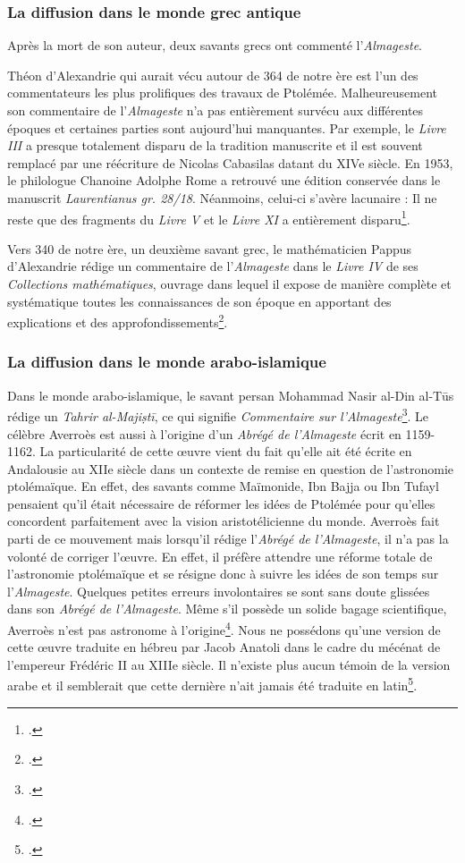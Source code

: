 \subsubsection{La diffusion dans le monde grec antique}
Après la mort de son auteur, deux savants grecs ont commenté l'\textit{Almageste}. 

Théon d'Alexandrie qui aurait vécu autour de 364 de notre ère est l'un des commentateurs les plus prolifiques des travaux de Ptolémée. Malheureusement son commentaire de l'\textit{Almageste} n'a pas entièrement survécu aux différentes époques et certaines parties sont aujourd'hui manquantes. Par exemple, le \textit{Livre III} a presque totalement disparu de la tradition manuscrite et il est souvent remplacé par une réécriture de Nicolas Cabasilas datant du XIVe siècle. En 1953, le philologue Chanoine Adolphe Rome a retrouvé une édition conservée dans le manuscrit \textit{Laurentianus gr. 28/18}. Néanmoins, celui-ci s'avère lacunaire : Il ne reste que des fragments du \textit{Livre V} et le \textit{Livre XI} a entièrement disparu\footcite{tihonLivreRetrouveCommentaire1987}. 

Vers 340 de notre ère, un deuxième savant grec, le mathématicien Pappus d'Alexandrie rédige un commentaire de l'\textit{Almageste} dans le \textit{Livre IV} de ses \textit{Collections mathématiques}, ouvrage dans lequel il expose de manière complète et systématique toutes les connaissances de son époque en apportant des explications et des approfondissements\footcite{meyerPAPPUS1999}. 

\subsubsection{La diffusion dans le monde arabo-islamique}
Dans le monde arabo-islamique, le savant persan Mohammad Nasir al-Din al-Tūs rédige un \textit{Tahrir al-Majiṣtī}, ce qui signifie \textit{Commentaire sur l'Almageste}\footcite{universalisMOHAMMADNASIRALDIN2008}. 
Le célèbre Averroès est aussi à l'origine d'un \textit{Abrégé de l'Almageste} écrit en 1159-1162. La particularité de cette œuvre vient du fait qu'elle ait été écrite en Andalousie au XIIe siècle dans un contexte de remise en question de l'astronomie ptolémaïque. En effet, des savants comme Maïmonide, Ibn Bajja ou Ibn Tufayl pensaient qu'il était nécessaire de réformer les idées de Ptolémée pour qu'elles concordent parfaitement avec la vision aristotélicienne du monde. Averroès fait parti de ce mouvement mais lorsqu'il rédige l'\textit{Abrégé de l'Almageste}, il n'a pas la volonté de corriger l'œuvre. En effet, il préfère attendre une réforme totale de l'astronomie ptolémaïque et se résigne donc à suivre les idées de son temps sur l'\textit{Almageste}.
Quelques petites erreurs involontaires se sont sans doute glissées dans son \textit{Abrégé de l'Almageste}. Même s'il possède un solide bagage scientifique, Averroès n'est pas astronome à l'origine\footcite{layAverroesAbregeDastronomie1998}. Nous ne possédons qu'une version de cette œuvre traduite en hébreu par Jacob Anatoli dans le cadre du mécénat de l'empereur Frédéric II au XIIIe siècle. Il n'existe plus aucun témoin de la version arabe et il semblerait que cette dernière n'ait jamais été traduite en latin\footcite{layAverroesHebraicusInedit2005}.


